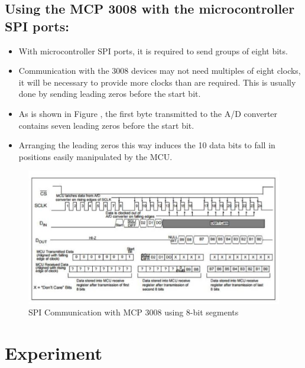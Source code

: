 \documentclass[11pt,a4paper]{article}
\begin{document}
\subsection{Using the MCP 3008 with the microcontroller SPI ports:}
\begin{itemize}
\item With microcontroller SPI ports, it is required to send groups of eight bits. 
\item Communication with the 3008 devices may not need multiples of eight clocks, it will be necessary to provide more clocks than are required. This is usually done by sending leading zeros before the start bit. 
\item As is shown in Figure , the first byte transmitted to the A/D converter contains seven leading zeros before the start bit. 
\item Arranging the leading zeros this way induces the 10 data bits to fall in positions easily manipulated by the MCU.
\end{itemize}
\begin{figure}[h!]
	\includegraphics[scale=0.7]{3.jpg}
	\centering
	\caption{SPI Communication with MCP 3008 using 8-bit segments}
\end{figure}
	

\newpage	
\section{Experiment}
\end{document}
